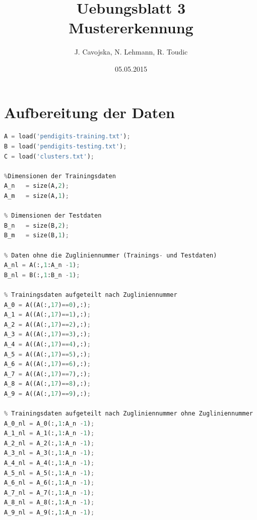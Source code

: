 \documentclass[12pt]{article}
\title{Uebungsblatt 3\\ \glqq Mustererkennung\grqq}
\author{J. Cavojska, N. Lehmann, R. Toudic}
\date{05.05.2015}
\begin{document}
\maketitle

\tableofcontents
\newpage

\section{Aufbereitung der Daten}
\begin{lstlisting}[language=Python]
% Trainingsdaten, Testdaten und Clusterdaten laden
A = load('pendigits-training.txt');
B = load('pendigits-testing.txt');
C = load('clusters.txt');

%Dimensionen der Trainingsdaten
A_n   = size(A,2);
A_m   = size(A,1);

% Dimensionen der Testdaten
B_n   = size(B,2);
B_m   = size(B,1);

% Daten ohne die Zugliniennummer (Trainings- und Testdaten)
A_nl = A(:,1:A_n -1);
B_nl = B(:,1:B_n -1);

% Trainingsdaten aufgeteilt nach Zugliniennummer
A_0 = A((A(:,17)==0),:);
A_1 = A((A(:,17)==1),:);
A_2 = A((A(:,17)==2),:);
A_3 = A((A(:,17)==3),:); 
A_4 = A((A(:,17)==4),:);
A_5 = A((A(:,17)==5),:);
A_6 = A((A(:,17)==6),:);
A_7 = A((A(:,17)==7),:);
A_8 = A((A(:,17)==8),:);
A_9 = A((A(:,17)==9),:);

% Trainingsdaten aufgeteilt nach Zugliniennummer ohne Zugliniennummer
A_0_nl = A_0(:,1:A_n -1);
A_1_nl = A_1(:,1:A_n -1);
A_2_nl = A_2(:,1:A_n -1);
A_3_nl = A_3(:,1:A_n -1);
A_4_nl = A_4(:,1:A_n -1);
A_5_nl = A_5(:,1:A_n -1);
A_6_nl = A_6(:,1:A_n -1);
A_7_nl = A_7(:,1:A_n -1);
A_8_nl = A_8(:,1:A_n -1);
A_9_nl = A_9(:,1:A_n -1);
\end{lstlisting}
\newpage
\end{document}
